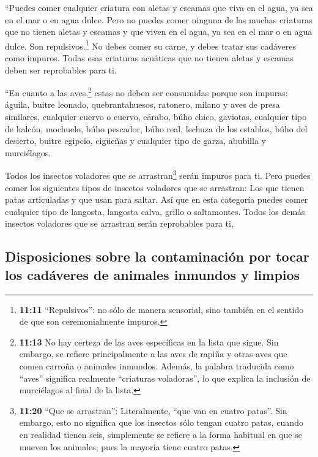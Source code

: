  ``Puedes comer cualquier criatura con aletas y escamas
que viva en el agua, ya sea en el mar o en agua dulce. 
Pero no puedes comer ninguna de las muchas criaturas que no tienen
aletas y escamas y que viven en el agua, ya sea en el mar o en agua
dulce.  Son repulsivos.\footnote{\textbf{11:11}
  ``Repulsivos'': no sólo de manera sensorial, sino también en el
  sentido de que son ceremonialmente impuros.} No debes comer su carne,
y debes tratar sus cadáveres como impuros.  Todas esas
criaturas acuáticas que no tienen aletas y escamas deben ser reprobables
para ti.

 ``En cuanto a las aves,\footnote{\textbf{11:13} No hay
  certeza de las aves específicas en la lista que sigue. Sin embargo, se
  refiere principalmente a las aves de rapiña y otras aves que comen
  carroña o animales inmundos. Además, la palabra traducida como
  ``aves'' significa realmente ``criaturas voladoras'', lo que explica
  la inclusión de murciélagos al final de la lista.} estas no deben ser
consumidas porque son impuras: águila, buitre leonado, quebrantahuesos,
 ratonero, milano y aves de presa similares,
 cualquier cuervo o cuervo,  cárabo, búho
chico, gaviotas, cualquier tipo de halcón,  mochuelo,
búho pescador, búho real,  lechuza de los establos, búho
del desierto, buitre egipcio,  cigüeñas y cualquier tipo
de garza, abubilla y murciélagos.

 Todos los insectos voladores que se arrastran\footnote{\textbf{11:20}
  ``Que se arrastran'': Literalmente, ``que van en cuatro patas''. Sin
  embargo, esto no significa que los insectos sólo tengan cuatro patas,
  cuando en realidad tienen seis, simplemente se refiere a la forma
  habitual en que se mueven los animales, pues la mayoría tiene cuatro
  patas.} serán impuros para ti.  Pero puedes comer los
siguientes tipos de insectos voladores que se arrastran: Los que tienen
patas articuladas y que usan para saltar.  Así que en
esta categoría puedes comer cualquier tipo de langosta, langosta calva,
grillo o saltamontes.  Todos los demás insectos voladores
que se arrastran serán reprobables para ti,

\hypertarget{disposiciones-sobre-la-contaminaciuxf3n-por-tocar-los-caduxe1veres-de-animales-inmundos-y-limpios}{%
\subsection{Disposiciones sobre la contaminación por tocar los cadáveres
de animales inmundos y
limpios}\label{disposiciones-sobre-la-contaminaciuxf3n-por-tocar-los-caduxe1veres-de-animales-inmundos-y-limpios}}

